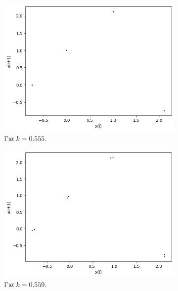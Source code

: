 \begin{figure}[h!]
\begin{subfigure}[c]{0.4\textwidth}
		\includegraphics[width=\textwidth]{LateX images/graphs/k0555}
		\caption{Για $k=0.555$.}
		\label{f:k10}
	\end{subfigure}
	\hfill
	\begin{subfigure}[c]{0.4\textwidth}
		\centering
		\includegraphics[width=\textwidth]{LateX images/graphs/k0559}
		\caption{Για $k=0.559$.}
		\label{f:k11}
	\end{subfigure}
	\hfill
	\begin{subfigure}[c]{0.4\textwidth}
		\centering

\end{subfigure}
\end{figure}
